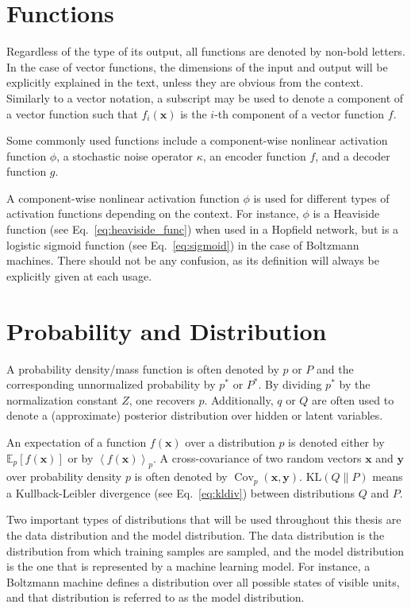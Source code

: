 \documentclass{now}
\newcommand{\vect}[1]{\mathbf{#1}}
\newcommand{\cov}[0]{\operatorname{Cov}}
\newcommand{\vx}[0]{\vect{x}}
\newcommand{\vy}[0]{\vect{y}}
\newcommand{\KL}[0]{\text{KL}}
\newcommand{\E}[0]{\mathbb{E}}
\begin{document}
\section*{Functions}

Regardless of the type of its output, all functions are
denoted by non-bold letters. In the case of vector
functions, the dimensions of the input and output will be
explicitly explained in the text, unless they are obvious
from the context. Similarly to a vector notation, a
subscript may be used to denote a component of a vector
function such that $f_i(\vx)$ is the $i$-th component of a
vector function $f$.

Some commonly used functions include a
component-wise nonlinear activation function $\phi$, a
stochastic noise operator $\kappa$, an encoder function $f$,
and a decoder function $g$.

A component-wise nonlinear activation function $\phi$ is
used for different types of activation functions depending
on the context. For instance, $\phi$ is a Heaviside function
(see Eq.~\eqref{eq:heaviside_func}) when used in a Hopfield
network, but is a logistic sigmoid function (see
Eq.~\eqref{eq:sigmoid}) in the case of Boltzmann machines.
There should not be any confusion, as its definition
will always be explicitly given at each usage.

\section*{Probability and Distribution}

A probability density/mass function is often denoted by $p$
or $P$ and the corresponding unnormalized probability by
$p^*$ or $P^*$.  By dividing $p^*$ by the normalization
constant $Z$, one recovers $p$. Additionally, $q$ or $Q$ are
often used to denote a (approximate) posterior distribution
over hidden or latent variables. 

An expectation of a function $f(\vx)$ over a distribution
$p$ is denoted either by $\E_p\left[ f(\vx) \right]$ or by
$\left< f(\vx) \right>_p$. A cross-covariance of two random
vectors $\vx$ and $\vy$ over probability density $p$ is
often denoted by $\cov_p(\vx, \vy)$. $\KL\left( Q \| P
\right)$ means a Kullback-Leibler divergence (see
Eq.~\eqref{eq:kldiv}) between
distributions $Q$ and $P$.

Two important types of distributions that will be used
throughout this thesis are the data distribution and the
model distribution.  The data distribution is the
distribution from which training samples are sampled, and
the model distribution is the one that is represented by a
machine learning model. For instance, a Boltzmann machine
defines a distribution over all possible states of visible
units, and that distribution is referred to as the model
distribution.
\end{document}
